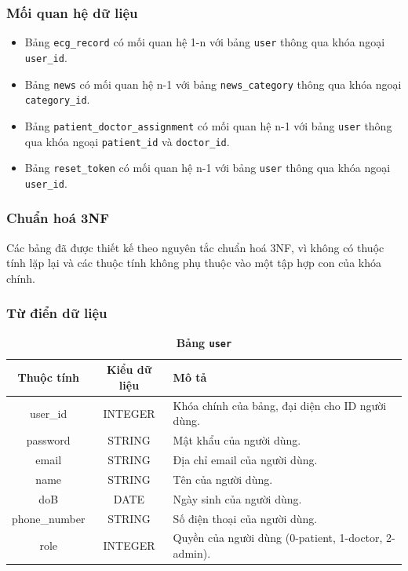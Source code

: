 \documentclass{article}%
\begin{document}
\subsubsection{Mối quan hệ dữ liệu}

\begin{itemize}
  \item Bảng \texttt{ecg\_record} có mối quan hệ 1-n với bảng \texttt{user} thông qua khóa ngoại \texttt{user\_id}.
  \item Bảng \texttt{news} có mối quan hệ n-1 với bảng \texttt{news\_category} thông qua khóa ngoại \texttt{category\_id}.
  \item Bảng \texttt{patient\_doctor\_assignment} có mối quan hệ n-1 với bảng \texttt{user} thông qua khóa ngoại \texttt{patient\_id} và \texttt{doctor\_id}.
  \item Bảng \texttt{reset\_token} có mối quan hệ n-1 với bảng \texttt{user} thông qua khóa ngoại \texttt{user\_id}.
\end{itemize}

\subsubsection{Chuẩn hoá 3NF}
Các bảng đã được thiết kế theo nguyên tắc chuẩn hoá 3NF, vì không có thuộc tính lặp lại và các thuộc tính không phụ thuộc vào một tập hợp con của khóa chính.
\subsubsection{Từ điển dữ liệu}



\begin{table}[H]
  \caption{\bfseries \fontsize{12pt}{0pt}\selectfont Bảng \texttt{user}}
  \centering
  \begin{tabularx}{0.9\textwidth}{|c|c|X|}
    \hline
    \textbf{Thuộc tính} & \textbf{Kiểu dữ liệu} & \textbf{Mô tả} \\
    \hline
    user\_id & INTEGER & Khóa chính của bảng, đại diện cho ID người dùng. \\
    \hline
    password & STRING & Mật khẩu của người dùng. \\
    \hline
    email & STRING & Địa chỉ email của người dùng. \\
    \hline
    name & STRING & Tên của người dùng. \\
    \hline
    doB & DATE & Ngày sinh của người dùng. \\
    \hline
    phone\_number & STRING & Số điện thoại của người dùng. \\
    \hline
    role & INTEGER & Quyền của người dùng (0-patient, 1-doctor, 2-admin). \\
    \hline
  \end{tabularx}
\end{table}
\end{document}
